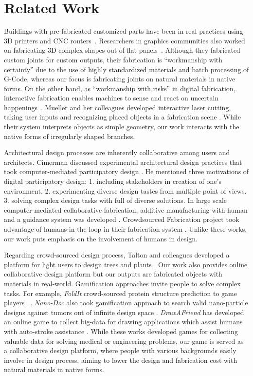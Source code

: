 \section{Related Work}
Buildings with pre-fabricated customized parts have been in real practices using 3D printers and CNC routers~\cite{knaack2012prefabricated}.
Researchers in graphics communities also worked on fabricating 3D complex shapes out of flat panels~\cite{schwartzburg2013fabrication,cignoni2014field,fu2015computational}.
Although they fabricated custom joints for custom outputs, their fabrication is ``workmanship with certainty'' due to the use of highly standardized materials and batch processing of G-Code, whereas our focus is fabricating joints on natural materials in native forms.
On the other hand, as ``workmanship with risks'' in digital fabrication, interactive fabrication enables machines to sense and react on uncertain happenings~\cite{willis2011interactive}.
Mueller and her colleagues developed interactive laser cutting, taking user inputs and recognizing placed objects in a fabrication scene \cite{Mueller:2012:ICI:2380116.2380191}.
While their system interprets objects as simple geometry, our work interacts with the native forms of irregularly shaped branches.

Architectural design processes are inherently collaborative among users and architects.
Cimerman discussed experimental architectural design practices that took computer-mediated participatory design \cite{cimerman2000participatory}.
He mentioned three motivations of digital participatory design:
1. including stakeholders in creation of one's environment.
2. experimenting diverse design tastes from multiple point of views.
3. solving complex design tasks with full of diverse solutions.
In large scale computer-mediated collaborative fabrication, additive manufacturing with human and a guidance system was developed \cite{Yoshida:2015:AHA:2809654.2766951}.
Crowdsourced Fabrication project took advantage of humans-in-the-loop in their fabrication system \cite{lafreniere2016crowdsourced}.
Unlike these works, our work puts emphasis on the involvement of humans in design.

Regarding crowd-sourced design process, Talton and colleagues developed a platform for light users to design trees and plants \cite{talton2009exploratory}.
Our work also provides online collaborative design platform but our outputs are fabricated objects with materials in real-world.
Gamification approaches invite people to solve complex tasks.
For example, \textit{FoldIt} crowd-sourced protein structure prediction to game players ~\cite{cooper2010predicting}.
\textit{Nano-Doc} also took gamification approach to search valid nano-particle designs against tumors out of infinite design space \cite{hauert2013computational}.
\textit{DrawAFriend} has developed an online game to collect big-data for drawing applications which assist humans with auto-stroke assistance \cite{limpaecher2013real}.
While these works developed games for collecting valuable data for solving medical or engineering problems, our game is served as a collaborative design platform, where people with various backgrounds easily involve in design process, aiming to lower the design and fabrication cost with natural materials in native forms.

